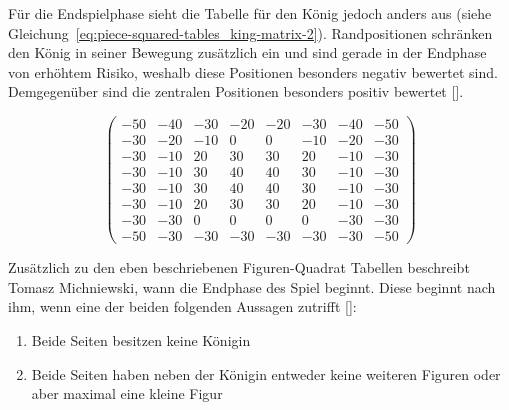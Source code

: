 \bigskip

\noindent Für die Endspielphase sieht die Tabelle für den König jedoch anders aus (siehe Gleichung~\ref{eq:piece-squared-tables_king-matrix-2}).
Randpositionen schränken den König in seiner Bewegung zusätzlich ein und sind gerade in der Endphase von erhöhtem Risiko, weshalb diese Positionen besonders negativ bewertet sind.
Demgegenüber sind die zentralen Positionen besonders positiv bewertet [\cite{Wiki2018}].

\begin{equation} \label{eq:piece-squared-tables_king-matrix-2}
\begin{pmatrix}
-50 & -40 & -30 & -20 & -20 & -30 & -40 & -50 \\
-30 & -20 & -10 & 0 & 0 & -10 & -20 & -30 \\
-30 & -10 & 20 & 30 & 30 & 20 & -10 & -30 \\
-30 & -10 & 30 & 40 & 40 & 30 & -10 & -30 \\
-30 & -10 & 30 & 40 & 40 & 30 & -10 & -30 \\
-30 & -10 & 20 & 30 & 30 & 20 & -10 & -30 \\
-30 & -30 & 0 & 0 & 0 & 0 & -30 & -30 \\
-50 & -30 & -30 & -30 & -30 & -30 & -30 & -50
\end{pmatrix}
\end{equation}

\bigskip

\noindent Zusätzlich zu den eben beschriebenen Figuren-Quadrat Tabellen beschreibt Tomasz Michniewski, wann die Endphase des Spiel beginnt.
Diese beginnt nach ihm, wenn eine der beiden folgenden Aussagen zutrifft [\cite{Wiki2018}]:

\begin{enumerate}
    \item Beide Seiten besitzen keine Königin
    \item Beide Seiten haben neben der Königin entweder keine weiteren Figuren oder aber maximal eine kleine Figur
\end{enumerate}
